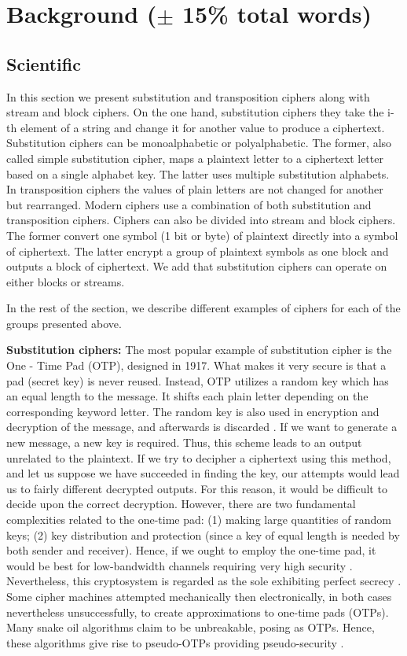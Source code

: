 \section{Background ($\pm$ 15\% total words)}
\subsection{Scientific}

In this section we present substitution and transposition ciphers along with stream and block ciphers. On the one hand, substitution ciphers they take the i-th element of a string and change it for another value to produce a ciphertext. Substitution ciphers can be monoalphabetic or polyalphabetic. The former, also called simple substitution cipher, maps a plaintext letter to a ciphertext letter based on a single alphabet key. The latter uses multiple substitution alphabets. In transposition ciphers the values of plain letters are not changed for another but rearranged. Modern ciphers use a combination of both substitution and transposition ciphers. Ciphers can also be divided into stream and block ciphers. The former convert one symbol (1 bit or byte) of plaintext directly into a symbol of ciphertext. The latter encrypt a group of plaintext symbols as one block and outputs a block of ciphertext. We add that substitution ciphers can operate on either blocks or streams. 

In the rest of the section, we describe different examples of ciphers for each of the groups presented above.

\textbf{Substitution ciphers:} 
The most popular example of substitution cipher is the One - Time Pad (OTP), designed in 1917. What makes it very secure is that a pad (secret key) is never reused. Instead, OTP utilizes a random key which has an equal length to the message. It shifts each plain letter depending on the corresponding keyword letter. The random key is also used in encryption and decryption of the message, and afterwards is discarded \cite{stallings2011}. If we want to generate a new message, a new key is required. Thus, this scheme leads to an output unrelated to the plaintext. If we try to decipher a ciphertext using this method, and let us suppose we have succeeded in finding the key, our attempts would lead us to fairly different decrypted outputs. For this reason, it would be difficult to decide upon the correct decryption. However, there are two fundamental complexities related to the one-time pad: (1) making large quantities of random keys; (2) key distribution and protection (since a key of equal length is needed by both sender and receiver)\cite{stallings2011}. Hence, if we ought to employ the one-time pad, it would be best for low-bandwidth channels requiring very high security \cite{stallings2011}. Nevertheless, this cryptosystem is regarded as the sole exhibiting perfect secrecy \cite{stallings2011}. Some cipher machines attempted mechanically then electronically, in both cases nevertheless unsuccessfully, to create approximations to one-time pads (OTPs). Many snake oil algorithms claim to be unbreakable, posing as OTPs. Hence, these algorithms give rise to pseudo-OTPs providing pseudo-security \cite{curtin1998}.

